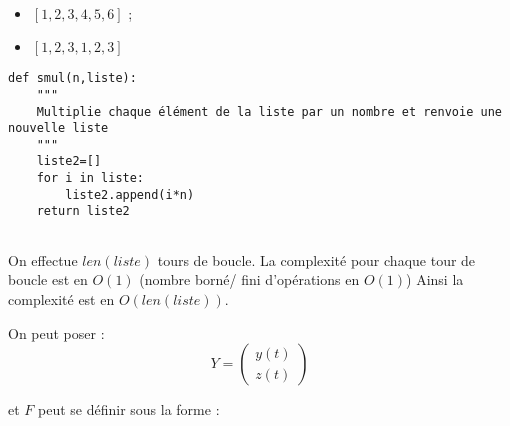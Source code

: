\exer{[EQD-001]}
\setcounter{numques}{0}~\\

\question{}

\begin{itemize}
\item $\left[1, 2, 3, 4, 5, 6\right]$ ;
\item $\left[1, 2, 3, 1, 2, 3\right]$
\end{itemize}

\question{}

\begin{lstlisting}
def smul(n,liste):
	"""
	Multiplie chaque élément de la liste par un nombre et renvoie une nouvelle liste
	"""
	liste2=[]
	for i in liste:
		liste2.append(i*n) 
	return liste2
	
\end{lstlisting}

\question{}

On effectue $len(liste)$ tours de boucle. La complexité pour chaque tour de boucle est en $O(1)$ (nombre borné/ fini d'opérations en $O(1)$) Ainsi la complexité est en $O(len(liste))$.


%
%
%
%

\question{} 



On peut poser :
$$Y=\left(
\begin{array}{c}
y(t)\\
z(t)
\end{array}
\right)$$

et $F$ peut se définir sous la forme : 

